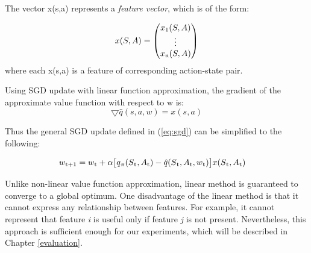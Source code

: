 \documentclass[12pt,twoside]{report}
\theoremstyle{plain}
\theoremstyle{definition}
\DeclareMathOperator{\E}{\mathbb{E}}
\begin{document}
The vector x(s,a) represents a \textit{feature vector}, which is of the form:

\begin{equation}
x(S, A) = \begin{pmatrix} x\textsubscript{1}(S, A) \\ \vdots \\ x\textsubscript{n}(S, A)  \end{pmatrix}
\end{equation}
where each x(s,a) is a feature of corresponding action-state pair.

Using SGD update with linear function approximation, the gradient of the approximate value function with respect to w is:
\begin{equation}
\bigtriangledown \hat{q}(s, a,w) = x(s, a)
\end{equation}

Thus the general SGD update defined in (\ref{eq:sgd}) can be simplified to the following:

\begin{equation}\label{eq:sgd_linear}
\begin{split}
w\textsubscript{t+1} & = w\textsubscript{t} +  \alpha  \big[ q\textsubscript{$\pi$}(S\textsubscript{t}, A\textsubscript{t}) - \hat{q}(S\textsubscript{t}, A\textsubscript{t}, w\textsubscript{t}) \big] x(S\textsubscript{t}, A\textsubscript{t})
\end{split}
\end{equation}

Unlike non-linear value function approximation, linear method is guaranteed to converge to a global optimum.
One disadvantage of the linear method is that it cannot express any relationship between features. For example, it cannot represent that feature \textit{i} is useful only if feature \textit{j} is not present.
Nevertheless,  this approach is sufficient enough for our experiments, which will be described in Chapter \ref{evaluation}.
\end{document}
